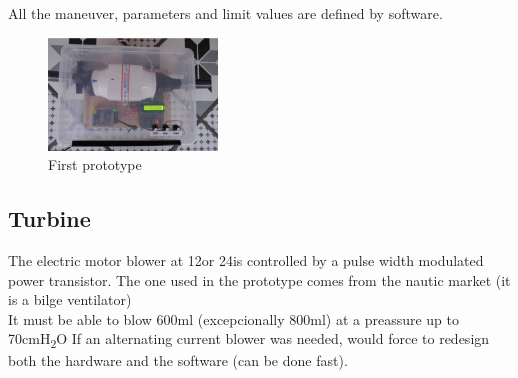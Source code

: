     All the maneuver, parameters and limit values are defined by software.
    \begin{figure}
        \centering
        \includegraphics[width=0.4\textwidth]{Img/prototipo-1.PNG}
        \caption{First prototype}
    \end{figure}
    
\subsection{Turbine}
    The electric motor blower at 12\Vcc or 24\Vcc is controlled by a pulse width modulated power transistor. The one used in the prototype comes from the nautic market (it is a bilge ventilator)\\    
    It must be able to blow 600ml (excepcionally 800ml) at a preassure up to 70cmH\textsubscript{2}O
    If an alternating current blower was needed, would force to redesign both the hardware and the software (can be done fast).

